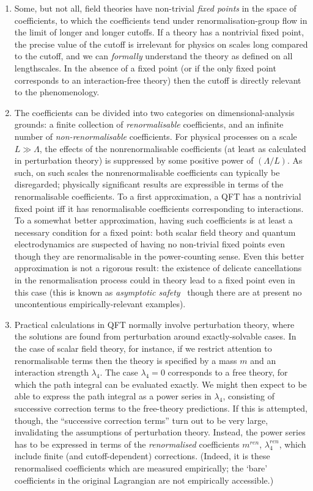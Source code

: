 \documentclass{article}
\begin{document}
\begin{enumerate}
\item Some, but not all, field theories have non-trivial \emph{fixed points} in the space of coefficients, to which the coefficients tend under renormalisation-group flow in the limit of longer and longer cutoffs. If a theory has a nontrivial fixed point, the precise value of the cutoff is irrelevant for physics on scales long compared to the cutoff, and we can \emph{formally} understand the theory as defined on all lengthscales. In the absence of a fixed point (or if the only fixed point corresponds to an interaction-free theory) then the cutoff is directly relevant to the phenomenology. 
\item The coefficients can be divided into two categories on dimensional-analysis grounds: a finite collection of \emph{renormalisable} coefficients, and an infinite number of \emph{non-renormalisable} coefficients. For physical processes on a scale $L \gg \Lambda$, the effects of the nonrenormalisable coefficients (at least as calculated in perturbation theory) is suppressed by some positive power of $(\Lambda/L)$. As such, on such scales the nonrenormalisable coefficients can typically be disregarded; physically significant results are expressible in terms of the renormalisable coefficients.
To a first approximation, a QFT has a nontrivial fixed point iff it has renormalisable coefficients corresponding to interactions. To a somewhat better approximation, having such coefficients is at least a necessary condition for a fixed point: both scalar field theory and quantum electrodynamics are suspected of having no non-trivial fixed points even though they are renormalisable in the power-counting sense. Even this better approximation is not a rigorous result: the existence of delicate cancellations in the renormalisation process could in theory lead to a fixed point even in this case (this is known as \emph{asymptotic safety}~\cite{weinbergasymptotic} though there are at present no uncontentious empirically-relevant examples).
\item Practical calculations in QFT normally involve perturbation theory, where the solutions are found from perturbation around exactly-solvable cases. In the case of scalar field theory, for instance, if we restrict attention to renormalisable terms then the theory is specified by a mass $m$ and an interaction strength $\lambda_4$. The case $\lambda_4=0$ corresponds to a free theory, for which the path integral can be evaluated exactly. We might then expect to be able to express the path integral as a power series in $\lambda_4$, consisting of successive correction terms to the free-theory predictions. If this is attempted, though, the ``successive correction terms'' turn out to be very large, invalidating the assumptions of perturbation theory. Instead, the power series has to be expressed in terms of the \emph{renormalised} coefficients $m^{ren}$, $\lambda_4^{ren}$, which include finite (and cutoff-dependent) corrections. (Indeed, it is these renormalised coefficients which are measured empirically; the `bare' coefficients in the original Lagrangian are not empirically accessible.)

\end{enumerate}
\end{document}
